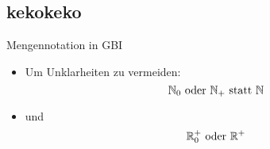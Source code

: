 \subsection{kekokeko}

\begin{frame}{Mengennotation in GBI}
	\begin{itemize}
		 \item Um Unklarheiten zu vermeiden:
    \[
    	\mathbb{N}_0 \text{ oder } \mathbb{N}_+ \text{ statt } \mathbb{N}
    \]
    \item und
    \[
    	\mathbb{R}_0^+ \text{ oder } \mathbb{R}^+
    \]
	\end{itemize}


\end{frame}